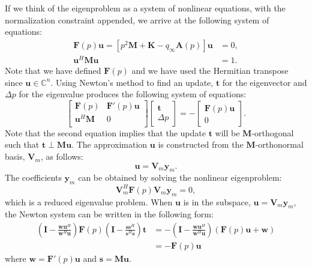\documentclass[12pt]{article}
\newcommand{\f}{\frac}
\newcommand{\mb}{\mathbf}
\begin{document}
If we think of the eigenproblem as a system of nonlinear equations,
with the normalization constraint appended, we arrive at the following
system of equations:
%
\begin{equation*}
  \begin{aligned}
    \mb{F}(p)\mb{u} = 
    \left[ p^{2} \mb{M} + \mb{K} - q_{\infty} \mb{A}(p) \right] \mb{u} & = 0, \\
    \mb{u}^{H} \mb{M} \mb{u} & = 1.
  \end{aligned}
\end{equation*}
Note that we have defined $\mb{F}(p)$ and we have used the Hermitian
transpose since $\mb{u} \in \mathbb{C}^{n}$. Using Newton's method
to find an update, $\mb{t}$ for the eigenvector and $\Delta p$ for
the eigenvalue produces the following system of equations:
%
\begin{equation*}
  \begin{bmatrix} 
    \mb{F}(p) & \mb{F}'(p)\mb{u} \\
    \mb{u}^{H}\mb{M} & 0  \\
  \end{bmatrix}
  \begin{bmatrix}
    \mb{t} \\
    \Delta p
  \end{bmatrix}
  = -
  \begin{bmatrix}
    \mb{F}(p)\mb{u} \\
    0
  \end{bmatrix}.
\end{equation*}
Note that the second equation implies that the update $\mb{t}$ will be
$\mb{M}$-orthogonal such that $\mb{t} \perp \mb{M} \mb{u}$.  The
approximation $\mb{u}$ is constructed from the $\mb{M}$-orthonormal
basis, $\mb{V}_{m}$, as follows:
%
\begin{equation*}
  \mb{u} = \mb{V}_{m} \mb{y}_{m}.
\end{equation*}
The coefficients $\mb{y}_{m}$ can be obtained by solving the nonlinear
eigenproblem:
%
\begin{equation*}
  \mb{V}_{m}^{H} \mb{F}(p) \mb{V}_{m} \mb{y}_{m} = 0,
\end{equation*}
which is a reduced eigenvalue problem. When $\mb{u}$ is in the
subspace, $\mb{u} = \mb{V}_{m} \mb{y}_{m}$, the Newton system can be
written in the following form:
%
\begin{equation*}
  \begin{aligned}
    \left(\mb{I} - \f{\mb{w}\mb{u}^{H}}{\mb{w}^{H}\mb{u}} \right)
    \mb{F}(p) \left(\mb{I} - \f{\mb{s}\mb{s}^{H}}{\mb{s}^{H} \mb{s}} \right) \mb{t} & =
    - \left(\mb{I} - \f{\mb{w}\mb{u}^{H}}{\mb{w}^{H}\mb{u}} \right) (\mb{F}(p)\mb{u} + \mb{w}) \\
    & = - \mb{F}(p)\mb{u}
  \end{aligned}
\end{equation*}
where $\mb{w} = \mb{F}'(p) \mb{u}$ and $\mb{s} = \mb{M} \mb{u}$.
\end{document}
